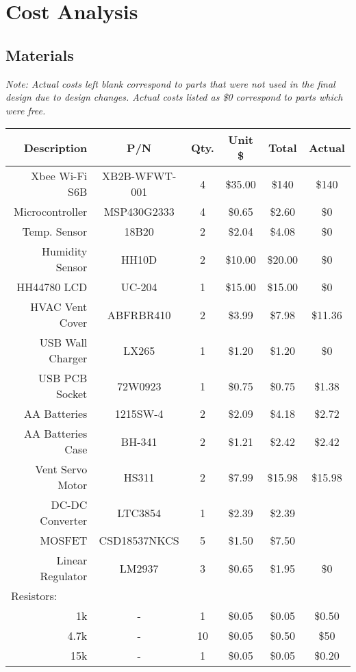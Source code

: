 \pagebreak
\section{Cost Analysis}
\subsection{Materials}
\emph{ Note: Actual costs left blank correspond to parts that were not used in the final design due to design changes.  Actual costs listed as \$0 correspond to parts which were free.}
\begin{center}
\begin{tabular}{|r|c|c|c|c|c|}
\hline
{Description} & {P/N} & {Qty.} & {Unit \$} & {Total} & {Actual}\\
\hline
\hline
Xbee Wi-Fi S6B & XB2B-WFWT-001 & 4 & \$35.00 & \$140 & \$140\\
\hline
Microcontroller & MSP430G2333 & 4 & \$0.65 & \$2.60 & \$0\\
\hline
Temp. Sensor & 18B20 & 2 & \$2.04 & \$4.08 & \$0\\
\hline
Humidity Sensor & HH10D & 2 & \$10.00 & \$20.00 & \$0\\
\hline
HH44780 LCD & UC-204 & 1 & \$15.00 & \$15.00 & \$0\\
\hline
HVAC Vent Cover & ABFRBR410 & 2 & \$3.99 & \$7.98 & \$11.36\\
\hline
USB Wall Charger & LX265 & 1 & \$1.20 & \$1.20 & \$0\\
\hline
USB PCB Socket & 72W0923 & 1 & \$0.75 & \$0.75 & \$1.38\\
\hline
AA Batteries & 1215SW-4 & 2 & \$2.09 & \$4.18 & \$2.72\\
\hline
AA Batteries Case & BH-341 & 2 & \$1.21 & \$2.42 & \$2.42\\
\hline
Vent Servo Motor & HS311 & 2 & \$7.99 & \$15.98 & \$15.98\\
\hline
DC-DC Converter & LTC3854 & 1 & \$2.39 & \$2.39 &\\
\hline
MOSFET & CSD18537NKCS & 5 & \$1.50 & \$7.50 &\\
\hline
Linear Regulator & LM2937 & 3 & \$0.65 & \$1.95 & \$0\\
\hline
\multicolumn{1}{|l|}{Resistors:} &   &   &   &  &\\
\hline
1k & - & 1 & \$0.05 & \$0.05 & \$0.50\\
\hline
{4.7k} & - & 10 & \$0.05 & \$0.50 & \$50\\
\hline
{15k} & - & 1 & \$0.05 & \$0.05 & \$0.20\\

\end{tabular}
\end{center}

